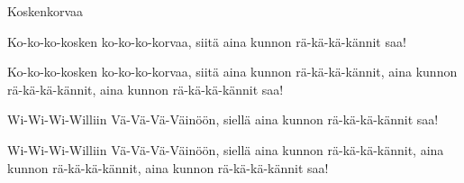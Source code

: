 \begin{song}{Koskenkorvaa}


	Ko-ko-ko-kosken ko-ko-ko-korvaa,
	siitä aina kunnon rä-kä-kä-kännit saa!
	
	Ko-ko-ko-kosken ko-ko-ko-korvaa,
	siitä aina kunnon rä-kä-kä-kännit,
	aina kunnon rä-kä-kä-kännit,
	aina kunnon rä-kä-kä-kännit saa!

	Wi-Wi-Wi-Williin Vä-Vä-Vä-Väinöön,
	siellä aina kunnon rä-kä-kä-kännit saa!

	Wi-Wi-Wi-Williin Vä-Vä-Vä-Väinöön,
	siellä aina kunnon rä-kä-kä-kännit,
	aina kunnon rä-kä-kä-kännit,
	aina kunnon rä-kä-kä-kännit saa!

\end{song}
